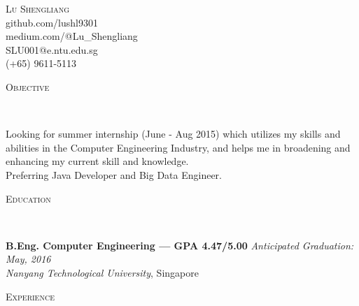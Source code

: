 \documentclass[a4paper, 10pt]{article}
\newenvironment{changemargin}[2]{%
  \begin{list}{}{%
      \setlength{\topsep}{0pt}%
      \setlength{\leftmargin}{#1}%
      \setlength{\rightmargin}{#2}%
      \setlength{\listparindent}{\parindent}%
      \setlength{\itemindent}{\parindent}%
      \setlength{\parsep}{\parskip}%
    }%
  \item[]}{\end{list}
}
\newcommand{\lineover}{
  \begin{changemargin}{-0.05in}{-0.05in}
    \vspace*{-8pt}
    \hrulefill \\
    \vspace*{-2pt}
  \end{changemargin}
}
\newcommand{\header}[1]{
  \begin{changemargin}{-0.5in}{-0.5in}
    \scshape{#1}\\
    \lineover
  \end{changemargin}
}
\newcommand{\contact}[5]{
  \begin{changemargin}{-0.5in}{-0.5in}
    \begin{center}
      {\Large \scshape {#1}}\\ \smallskip
      {#2}\\ \smallskip
      {#3}\\ \smallskip
      {#4}\\ \smallskip
      {#5}   \smallskip
    \end{center}
  \end{changemargin}
}
\newenvironment{body}
{
\vspace*{-16pt}
\begin{changemargin}{-0.25in}{-0.5in}
}	
{
\end{changemargin}
}
\begin{document}
\contact{Lu Shengliang}{github.com/lushl9301}{medium.com/@Lu\_Shengliang}{SLU001@e.ntu.edu.sg}{(+65) 9611-5113}


\header{Objective}

\begin{body}
  \vspace{14pt}
  Looking for summer internship (June - Aug 2015) which utilizes my skills and abilities in the Computer Engineering Industry, and helps me in broadening and enhancing my current skill and knowledge.\\
  \smallskip
  Preferring Java Developer and Big Data Engineer.
\end{body}

\medskip

\header{Education}

\begin{body}
  \vspace{14pt}
  \textbf{B.Eng. Computer Engineering --- GPA 4.47/5.00} \hfill \emph{Anticipated Graduation: May, 2016} \\
  \emph{Nanyang Technological University}, Singapore\\
\end{body}

\smallskip
\medskip

\header{Experience}
\end{document}
